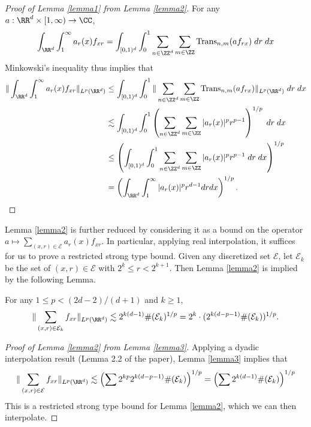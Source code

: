 \begin{proof}[Proof of Lemma \ref{lemma1} from Lemma \ref{lemma2}]
    For any $a: \RR^d \times [1,\infty) \to \CC$,
    \[ \int_{\RR^d} \int_1^\infty a_r(x) f_{x r} = \int_{[0,1)^d} \int_0^1 \sum_{n \in \ZZ^d} \sum_{m \in \ZZ} \text{Trans}_{n,m} (a f_{rx})\; dr\; dx \]
    Minkowski's inequality thus implies that
    \begin{align*}
    \| \int_{\RR^d} \int_1^\infty a_r(x) f_{x r} \|_{L^p(\RR^d)} &\leq \int_{[0,1)^d} \int_0^1 \| \sum_{n \in \ZZ^d} \sum_{m \in \ZZ} \text{Trans}_{n,m} (a f_{rx}) \|_{L^p(\RR^d)}\; dr\; dx\\
    &\lesssim \int_{[0,1)^d} \int_0^1 \left( \sum_{n \in \ZZ^d} \sum_{m \in \ZZ} |a_r(x)|^p r^{p-1} \right)^{1/p}\; dr\; dx\\
    &\leq \left( \int_{[0,1)^d} \int_0^1 \sum_{n \in \ZZ^d} \sum_{m \in \ZZ} |a_r(x)|^p r^{p-1}\; dr\; dx \right)^{1/p}\\
    &= \left( \int_{\RR^d} \int_1^\infty |a_r(x)|^p r^{d-1} dr dx \right)^{1/p}. \qedhere
    \end{align*}
\end{proof}

Lemma \ref{lemma2} is further reduced by considering it as a bound on the operator $a \mapsto \sum_{(x,r) \in \mathcal{E}} a_r(x) f_{xr}$. In particular, applying real interpolation, it suffices for us to prove a restricted strong type bound. Given any discretized set $\mathcal{E}$, let $\mathcal{E}_k$ be the set of $(x,r) \in \mathcal{E}$ with $2^k \leq r < 2^{k+1}$. Then Lemma \ref{lemma2} is implied by the following Lemma.

\begin{lemma} \label{lemma3}
    For any $1 \leq p < (2d - 2)/(d+1)$ and $k \geq 1$,
    \[ \| \sum_{(x,r) \in \mathcal{E}_k} f_{xr} \|_{L^p(\RR^d)} \lesssim 2^{k(d - 1)} \#(\mathcal{E}_k)^{1/p} = 2^k \cdot (2^{k(d-p-1)} \#(\mathcal{E}_k))^{1/p}. \]
\end{lemma}

\begin{proof}[Proof of Lemma \ref{lemma2} from Lemma \ref{lemma3}]
    Applying a dyadic interpolation result (Lemma 2.2 of the paper), Lemma \ref{lemma3} implies that
    \[ \| \sum_{(x,r) \in \mathcal{E}} f_{xr} \|_{L^p(\RR^d)} \lesssim \left( \sum 2^{kp} 2^{k(d-p-1)} \#(\mathcal{E}_k) \right)^{1/p} = \left( \sum 2^{k(d-1)} \#(\mathcal{E}_k) \right)^{1/p} \]
    This is a restricted strong type bound for Lemma \ref{lemma2}, which we can then interpolate.
\end{proof}

